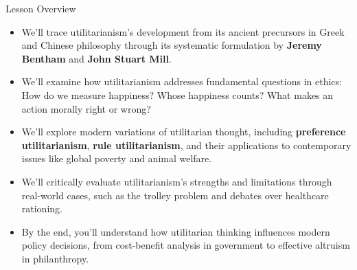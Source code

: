 \documentclass[aspectratio=169]{beamer}
\begin{document}
\begin{frame}{Lesson Overview}
    \begin{itemize}
        \item We'll trace utilitarianism's development from its ancient precursors in Greek and Chinese philosophy through its systematic formulation by \textbf{Jeremy Bentham} and \textbf{John Stuart Mill}.
        
        \item We'll examine how utilitarianism addresses fundamental questions in ethics: How do we measure happiness? Whose happiness counts? What makes an action morally right or wrong?
        
        \item We'll explore modern variations of utilitarian thought, including \textbf{preference utilitarianism}, \textbf{rule utilitarianism}, and their applications to contemporary issues like global poverty and animal welfare.
        
        \item We'll critically evaluate utilitarianism's strengths and limitations through real-world cases, such as the trolley problem and debates over healthcare rationing.
        
        \item By the end, you'll understand how utilitarian thinking influences modern policy decisions, from cost-benefit analysis in government to effective altruism in philanthropy.
    \end{itemize}
\end{frame}
\end{document}
